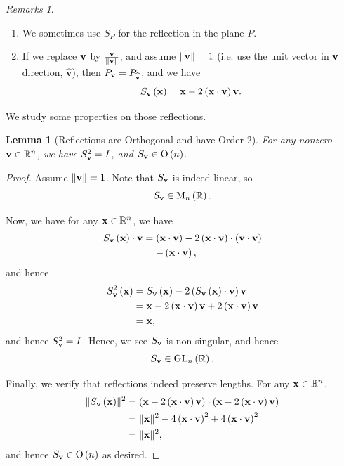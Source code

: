 \documentclass{article}
\newtheorem{lemma}[theorem]{Lemma}
\theoremstyle{definition}
\theoremstyle{remark}
\newcommand{\pqty}[1]{\left(#1\right)}
\newcommand{\RR}{\mathbb{R}}
\newcommand{\GL}{\operatorname{GL}}
\newtheorem{remarks}[theorem]{Remarks}
\DeclarePairedDelimiter{\norm}{\lVert}{\rVert}
\newcommand{\identityM}{I}
\newcommand{\matrixset}{\mathrm{M}}
\newcommand{\unitv}[1]{\widehat{\mathbf{#1}}}
\newcommand{\Or}{\operatorname{O}}
\begin{document}
\begin{remarks}
    \begin{enumerate}
        \item We sometimes use \(S_P\) for the reflection in the plane \(P\).
        \item If we replace \(\vb{v}\) by \(\frac{\vb{v}}{\norm{\vb{v}}}\), and assume \(\norm{\vb{v}} = 1\) (i.e. use the unit vector in \(\vb{v}\) direction, \(\unitv{v}\)), then \(P_{\vb{v}} = P_{\unitv{v}}\), and we have
        \[
        S_{\vb{v}} \pqty{\vb{x}} = \vb{x} - 2 \pqty{\vb{x} \cdot \vb{v}} \vb{v}.
        \]
    \end{enumerate}
\end{remarks}

We study some properties on those reflections.

\begin{lemma}[Reflections are Orthogonal and have Order 2]
    \label{lem:reflections-orthogonal-order-2}%
    For any nonzero \(\vb{v} \in \RR^n\), we have \(S_{\vb{v}}^2 = \identityM\), and \(S_{\vb{v}} \in \Or\pqty{n}\).    
\end{lemma}

\begin{proof}
    Assume \(\norm{\vb{v}} = 1\). Note that \(S_{\vb{v}}\) is indeed linear, so
    \[
        S_{\vb{v}} \in \matrixset_n \pqty{\RR}.
    \]

    Now, we have for any \(\vb{x} \in \RR^n\), we have
    \begin{align*}
        S_{\vb{v}} \pqty{\vb{x}} \cdot \vb{v} &= \pqty{\vb{x} \cdot \vb{v}} - 2 \pqty{\vb{x} \cdot \vb{v}} \cdot \pqty{\vb{v} \cdot \vb{v}} \\
        &= - \pqty{\vb{x} \cdot \vb{v}},
    \end{align*}
    and hence
    \begin{align*}
        S_{\vb{v}}^2 \pqty{\vb{x}} &= S_{\vb{v}} \pqty{\vb{x}} - 2 \pqty{S_{\vb{v}} \pqty{\vb{x}} \cdot \vb{v}} \vb{v} \\
        &= \vb{x} - 2\pqty{\vb{x} \cdot \vb{v}} \vb{v} + 2 \pqty{\vb{x} \cdot \vb{v}} \vb{v} \\
        &= \vb{x},
    \end{align*}
    and hence \(S_{\vb{v}}^2 = \identityM\). Hence, we see \(S_{\vb{v}}\) is non-singular, and hence
    \[
        S_{\vb{v}} \in \GL_n \pqty{\RR}.
    \]

    Finally, we verify that reflections indeed preserve lengths. For any \(\vb{x} \in \RR^n\),
    \begin{align*}
        \norm{S_{\vb{v}} \pqty{\vb{x}}}^2 &= \pqty{\vb{x} - 2 \pqty{\vb{x} \cdot \vb{v}} \vb{v}} \cdot \pqty{\vb{x} - 2 \pqty{\vb{x} \cdot \vb{v}} \vb{v}} \\
        &= \norm{\vb{x}}^2 - 4 \pqty{\vb{x} \cdot \vb{v}}^2 + 4 \pqty{\vb{x} \cdot \vb{v}}^2 \\
        &= \norm{\vb{x}}^2,
    \end{align*}
    and hence \(S_{\vb{v}} \in \Or\pqty{n}\) as desired.
\end{proof}
\end{document}
